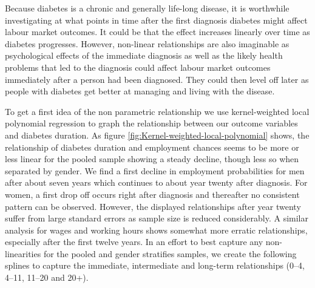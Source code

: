 Because diabetes is a chronic and generally life-long disease, it
is worthwhile investigating at what points in time after the first
diagnosis diabetes might affect labour market outcomes. It could be
that the effect increases linearly over time as diabetes progresses.
However, non-linear relationships are also imaginable as psychological
effects of the immediate diagnosis as well as the likely health problems
that led to the diagnosis could affect labour market outcomes immediately
after a person had been diagnosed. They could then level off later
as people with diabetes get better at managing and living with the
disease.

To get a first idea of the non parametric relationship we use kernel-weighted local polynomial regression to graph
the relationship between our outcome variables and diabetes duration. As figure \ref{fig:Kernel-weighted-local-polynomial}
shows, the relationship of diabetes duration and employment chances
seems to be more or less linear for the pooled sample showing a steady
decline, though less so when separated by gender. We find a first
decline in employment probabilities for men after about seven years
which continues to about year twenty after diagnosis. For women, a
first drop off occurs right after diagnosis and thereafter no
consistent pattern can be observed. However, the displayed relationships
after year twenty suffer from large standard errors as sample size
is reduced considerably. A similar analysis for wages and working hours shows
somewhat more erratic  relationships, especially after the first twelve
years. In an effort to best capture any non-linearities for the pooled
and gender stratifies samples, we create the following splines to
capture the immediate, intermediate and long-term relationships (0--4,
4--11, 11--20 and 20+).   
  
  
  
  
  
  
  
  
  
  
  
  
  